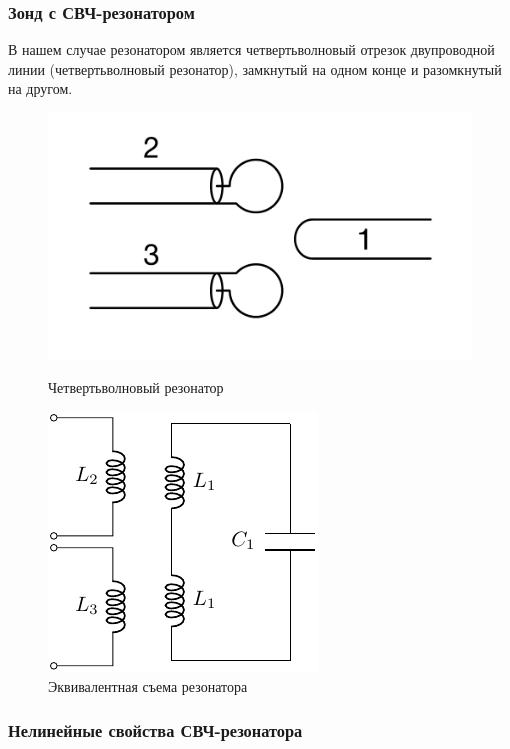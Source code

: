 \documentclass[10pt,pdf,hyperref={unicode}, dvipsnames]{beamer}
\begin{document}
\begin{frame}
\begin{frame}
	\frametitle{Зонд с СВЧ-резонатором}
	В нашем случае резонатором является четвертьволновый отрезок двупроводной линии (четвертьволновый резонатор), замкнутый на одном конце и разомкнутый на другом. 
	\begin{figure}[H]
	\begin{minipage}{0.49\linewidth}
			\centering
			\includegraphics[width=\linewidth]{fig/resonator}
			\caption{Четвертьволновый резонатор}
			\label{fig:resonator}
	\end{minipage}
	\begin{minipage}{0.49\linewidth}		
			\centering
			\includegraphics[]{chem/chem1}
			\caption{Эквивалентная съема резонатора}
			\label{fig:chem1}
	\end{minipage}
	\end{figure}
\end{frame}

\begin{frame}[t]\frametitle{Нелинейные свойства СВЧ-резонатора}
    



\end{frame}
\end{frame}
\end{document}
